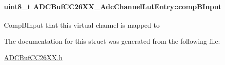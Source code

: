 \paragraph[{comp\+B\+Input}]{\setlength{\rightskip}{0pt plus 5cm}uint8\+\_\+t A\+D\+C\+Buf\+C\+C26\+X\+X\+\_\+\+Adc\+Channel\+Lut\+Entry\+::comp\+B\+Input}\label{struct_a_d_c_buf_c_c26_x_x___adc_channel_lut_entry_a19d95582232ec92376195e302f7263b6}
Comp\+B\+Input that this virtual channel is mapped to 

The documentation for this struct was generated from the following file\+:\begin{DoxyCompactItemize}
\item 
\hyperlink{_a_d_c_buf_c_c26_x_x_8h}{A\+D\+C\+Buf\+C\+C26\+X\+X.\+h}\end{DoxyCompactItemize}
